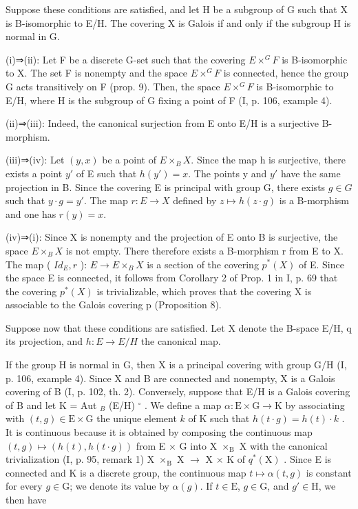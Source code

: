 Suppose these conditions are satisfied, and let H be a subgroup of G such that X is B-isomorphic to E/H. The covering X is Galois if and only if the subgroup H is normal in G.

(i)⇒(ii): Let F be a discrete G-set such that the covering \(E \times^{G} F\) is B-isomorphic to X. The set F is nonempty and the space \(E \times^{G} F\) is connected, hence the group G acts transitively on F (prop. 9). Then, the space \(E \times^{G} F\) is B-isomorphic to E/H, where H is the subgroup of G fixing a point of F (I, p. 106, example 4).

(ii)⇒(iii): Indeed, the canonical surjection from E onto E/H is a surjective B-morphism.

(iii)⇒(iv): Let \((y, x)\) be a point of \(E \times_{B} X\). Since the map h is surjective, there exists a point \(y'\) of E such that \(h(y') = x\). The points y and \(y'\) have the same projection in B. Since the covering E is principal with group G, there exists \(g \in G\) such that \(y \cdot g = y'\). The map \(r: E \to X\) defined by \(z \mapsto h(z \cdot g)\) is a B-morphism and one has \(r(y) = x\).

(iv)⇒(i): Since X is nonempty and the projection of E onto B is surjective, the space \(E \times_{B} X\) is not empty. There therefore exists a B-morphism r from E to X. The map ( \(Id_{E}, r\) ): \(E \to E \times_{B} X\) is a section of the covering \(p^{*}(X)\) of E. Since the space E is connected, it follows from Corollary 2 of Prop. 1 in I, p. 69 that the covering \(p^{*}(X)\) is trivializable, which proves that the covering X is associable to the Galois covering p (Proposition 8).

Suppose now that these conditions are satisfied. Let X denote the B-space E/H, q its projection, and \(h: E \rightarrow E/H\) the canonical map.

If the group H is normal in G, then X is a principal covering with group G/H (I, p. 106, example 4). Since X and B are connected and nonempty, X is a Galois covering of B (I, p. 102, th. 2). Conversely, suppose that E/H is a Galois covering of B and let K = Aut \(_{B}\) (E/H) \(^{\circ}\) . We define a map \(\alpha: \mathrm{E} \times \mathrm{G} \to \mathrm{K}\) by associating with \((t, g) \in \mathrm{E} \times \mathrm{G}\) the unique element \(k\) of K such that \(h(t \cdot g) = h(t) \cdot k\) . It is continuous because it is obtained by composing the continuous map \((t, g) \mapsto (h(t), h(t \cdot g))\) from E \(\times\) G into X \(\times_{\mathrm{B}}\) X with the canonical trivialization (I, p. 95, remark 1) X \(\times_{\mathrm{B}}\) X \(\to\) X \(\times\) K of \(q^{*}(\mathrm{X})\) . Since E is connected and K is a discrete group, the continuous map \(t \mapsto \alpha(t, g)\) is constant for every \(g \in \mathrm{G}\); we denote its value by \(\alpha(g)\). If \(t \in \mathrm{E}\), \(g \in \mathrm{G}\), and \(g' \in \mathrm{H}\), we then have

